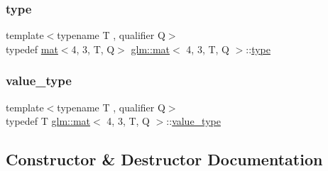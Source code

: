 \mbox{\label{structglm_1_1mat_3_014_00_013_00_01_t_00_01_q_01_4_a5c9dc0bf9dfa3af93210f80d90257861}} 
\subsubsection{\texorpdfstring{type}{type}}
{\footnotesize\ttfamily template$<$typename T , qualifier Q$>$ \\
typedef \hyperlink{structglm_1_1mat}{mat}$<$4, 3, T, Q$>$ \hyperlink{structglm_1_1mat}{glm\+::mat}$<$ 4, 3, T, Q $>$\+::\hyperlink{structglm_1_1mat_3_014_00_013_00_01_t_00_01_q_01_4_a5c9dc0bf9dfa3af93210f80d90257861}{type}}

\mbox{\label{structglm_1_1mat_3_014_00_013_00_01_t_00_01_q_01_4_ad5a9ca85d27eb13ba59ee335bdb6783f}} 
\subsubsection{\texorpdfstring{value\+\_\+type}{value\_type}}
{\footnotesize\ttfamily template$<$typename T , qualifier Q$>$ \\
typedef T \hyperlink{structglm_1_1mat}{glm\+::mat}$<$ 4, 3, T, Q $>$\+::\hyperlink{structglm_1_1mat_3_014_00_013_00_01_t_00_01_q_01_4_ad5a9ca85d27eb13ba59ee335bdb6783f}{value\+\_\+type}}



\subsection{Constructor \& Destructor Documentation}
\mbox{\label{structglm_1_1mat_3_014_00_013_00_01_t_00_01_q_01_4_a29e047d87eb90b8703e6955d135451b6}} 

